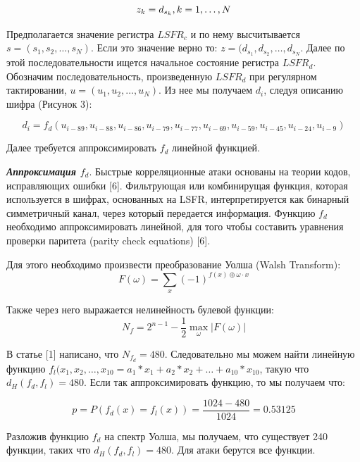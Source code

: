 \documentclass[colorthm]{./civarticle}
\begin{document}
\begin{equation}
    z_k = d_{s_k}, \space k = 1, \dots, N
\end{equation}

Предполагается значение регистра $LSFR_c$ и по нему высчитывается $s = (s_1, s_2, \dots, s_N)$. Если это значение верно то: $z = (d_{s_1}, d_{s_2}, \dots, d_{s_N}$. Далее по этой последовательности ищется начальное состояние регистра $LSFR_d$. Обозначим последовательность, произведенную $LSFR_d$ при регулярном тактировании, $u = (u_1, u_2, \dots, u_N)$. Из нее мы получаем $d_i$, следуя описанию шифра (Рисунок 3):

\begin{equation}
    d_i = f_d(u_{i-89}, u_{i-88}, u_{i-86}, u_{i-79}, u_{i-77}, u_{i-69}, u_{i-59}, u_{i-45}, u_{i-24}, u_{i-9})
\end{equation}

Далее требуется аппроксимировать $f_d$ линейной функцией.

\textbf{\emph{Аппроксимация $f_d$}}. Быстрые корреляционные атаки основаны на теории кодов, исправляющих ошибки [6]. Фильтрующая или комбинирущая функция, которая используется в шифрах, основанных на LSFR, интерпретируется как бинарный симметричный канал, через который передается информация. Функцию $f_d$ необходимо аппроксимировать линейной, для того чтобы составить уравнения проверки паритета (parity check equations) [6].

 Для этого необходимо произвести преобразование Уолша (Walsh Transform): 
\begin{equation}
        F(\omega)=\sum_x(-1)^{f(x) \oplus \omega \cdot x}
\end{equation}

Также через него выражается нелинейность булевой функции:
\begin{equation}
        N_f=2^{n-1}-\frac{1}{2} \max _\omega|F(\omega)|
\end{equation}

В статье [1] написано, что $N_{f_d} = 480$. Следовательно мы можем найти линейную функцию $f_l(x_1, x_2, \dots, x_{10} = a_1*x_1+a_2*x_2+ \dots +a_{10}*x_{10}$, такую что $d_H(f_d, f_l) = 480$. Если так аппроксимировать функцию, то мы получаем что: 

\begin{equation}
    p = P\left(f_d(x)=f_l(x)\right)=\frac{1024-480}{1024}=0.53125
\end{equation}

Разложив функцию $f_d$ на спектр Уолша, мы получаем, что существует 240 функции, таких что $d_H(f_d, f_l) = 480$. Для атаки берутся все функции.
\end{document}
